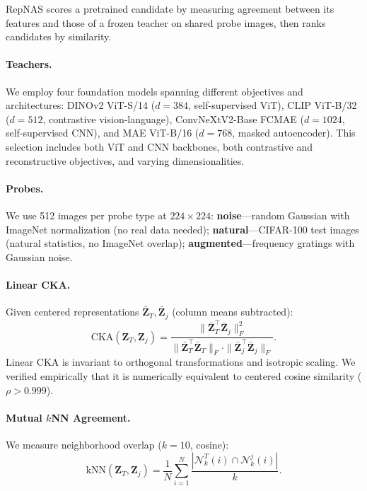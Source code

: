 \documentclass[10pt,twocolumn,letterpaper]{article}
\begin{document}
RepNAS scores a pretrained candidate by measuring agreement between its features and those of a frozen teacher on shared probe images, then ranks candidates by similarity.

\paragraph{Teachers.}
We employ four foundation models spanning different objectives and architectures:
DINOv2 ViT-S/14 ($d{=}384$, self-supervised ViT),
CLIP ViT-B/32 ($d{=}512$, contrastive vision-language),
ConvNeXtV2-Base FCMAE ($d{=}1024$, self-supervised CNN),
and MAE ViT-B/16 ($d{=}768$, masked autoencoder).
This selection includes both ViT and CNN backbones, both contrastive and reconstructive objectives, and varying dimensionalities.

\paragraph{Probes.}
We use 512 images per probe type at $224 {\times} 224$:
\textbf{noise}---random Gaussian with ImageNet normalization (no real data needed);
\textbf{natural}---CIFAR-100 test images (natural statistics, no ImageNet overlap);
\textbf{augmented}---frequency gratings with Gaussian noise.

\paragraph{Linear CKA.}
Given centered representations $\bar{\mathbf{Z}}_T, \bar{\mathbf{Z}}_j$ (column means subtracted):
\begin{equation}
\text{CKA}(\mathbf{Z}_T, \mathbf{Z}_j) = \frac{\|\bar{\mathbf{Z}}_T^\top \bar{\mathbf{Z}}_j\|_F^2}{\|\bar{\mathbf{Z}}_T^\top \bar{\mathbf{Z}}_T\|_F \cdot \|\bar{\mathbf{Z}}_j^\top \bar{\mathbf{Z}}_j\|_F}.
\label{eq:cka}
\end{equation}
Linear CKA is invariant to orthogonal transformations and isotropic scaling.
We verified empirically that it is numerically equivalent to centered cosine similarity ($\rho > 0.999$).

\paragraph{Mutual $k$NN Agreement.}
We measure neighborhood overlap ($k{=}10$, cosine):
\begin{equation}
\text{kNN}(\mathbf{Z}_T, \mathbf{Z}_j) = \frac{1}{N}\sum_{i=1}^{N} \frac{|\mathcal{N}_k^T(i) \cap \mathcal{N}_k^j(i)|}{k}.
\label{eq:knn}
\end{equation}
\end{document}
